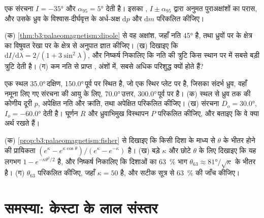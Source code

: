 \begin{exercise}[$\star\star$]\label{exo:b3:palaeomagnetism:9}
एक संरचना $I = \ang{-35}$ और $\alpha_{95} = \ang{5}$ देती है। इसका
, $I \pm \alpha_{95}$ द्वारा अनुमत पुराअक्षांशों का परास, और
उसके ध्रुव के विश्वास-दीर्घवृत्त के अर्ध-अक्ष $\mathrm dp$ और $\mathrm dm$
परिकलित कीजिए।
\end{exercise}

\begin{exercise}[$\star\star\star$]\label{exo:b3:palaeomagnetism:10}
 (क) \cref{thm:b3:palaeomagnetism:dipole} से वह अक्षांश, जहाँ
नति \ang{45} है, तथा ध्रुवों पर के क्षेत्र का
विषुवत रेखा पर के क्षेत्र से अनुपात ज्ञात कीजिए। (ख) दिखाइए कि $\mathrm dI/\mathrm d\lambda = 2/(1 + 3\sin^2\lambda)$,
और निष्कर्ष निकालिए कि नति की त्रुटि किस स्थान पर
 में सबसे बड़ी त्रुटि देती है। (ग) कम नति से प्राप्त , अंशों में,
सबसे अधिक परिशुद्ध क्यों होते हैं?
\end{exercise}

\begin{exercise}[$\star\star\star$]\label{exo:b3:palaeomagnetism:11}
एक स्थल \ang{35.0}\,दक्षिण, \ang{150.0}\,पूर्व पर स्थित है, जो एक स्थिर प्लेट पर है, जिसका संदर्भ
ध्रुव, वहाँ नमूना लिए गए संरचना की आयु के लिए, \ang{70.0}\,उत्तर,
\ang{300.0}\,पूर्व पर है। (क) स्थल से ध्रुव तक की कोणीय दूरी $p$,
अपेक्षित नति और क्रांति, तथा अपेक्षित  परिकलित कीजिए।
(ख) संरचना $D_o = \ang{30.0}$, $I_o = \ang{-60.0}$ देती है। घूर्णन $R$ और
ध्रुवाभिमुख विस्थापन $P$ परिकलित कीजिए, और बताइए कि वे क्या अर्थ रखते हैं।
\end{exercise}

\begin{exercise}[$\star\star\star$]\label{exo:b3:palaeomagnetism:12}
(क) \cref{prop:b3:palaeomagnetism:fisher} से दिखाइए कि किसी दिशा के
माध्य से $\theta$ के भीतर होने की प्रायिकता $(e^\kappa -
e^{\kappa\cos\theta})/(e^\kappa - e^{-\kappa})$ है। (ख) बड़े $\kappa$ और
छोटे $\theta$ के लिए दिखाइए कि यह लगभग $1 - e^{-\kappa\theta^2/2}$ है, और निष्कर्ष निकालिए
कि दिशाओं का \qty{63}{\percent} भाग $\theta_{63} \approx
\ang{81}/\sqrt\kappa$ के भीतर है। (ग) $\theta_{63}$ परिकलित कीजिए, जहाँ $\kappa = 50$ है,
और सटीक सूत्र से \qty{63}{\percent} की जाँच कीजिए।
\end{exercise}

\section{समस्या: केस्टा के लाल संस्तर}

